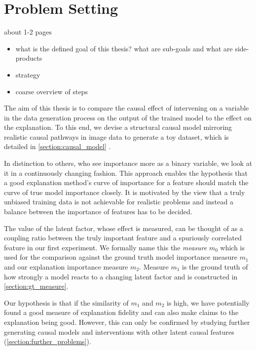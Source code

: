 \chapter{Problem Setting}\label{chapter:problem_setting}
{ \color{red}

    about 1-2 pages

    \begin{itemize}
        \item what is the defined goal of this thesis? what are sub-goals and what are side-products
        \item strategy
        \item coarse overview of steps
    \end{itemize}
}

The aim of this thesis is to compare the causal effect of intervening on a variable in the data generation process on the output of the trained model to the effect on the explanation. To this end, we devise a structural causal model mirroring realistic causal pathways in image data to generate a toy dataset, which is detailed in \autoref{section:causal_model} .


In distinction to others, who see importance more as a binary variable, we look at it in a continuously changing fashion. This approach enables the hypothesis that a good explanation method's curve of importance for a feature should match the curve of true model importance closely. It is motivated by the view that a truly unbiased training data is not achievable for realistic problems and instead a balance between the importance of features has to be decided. 

 
The value of the latent factor, whose effect is measured, can be thought of as a coupling ratio between the truly important feature and a spuriously correlated feature in our first experiment. We formally name this the \textit{measure} $m_0$ which is used for the comparison against the ground truth model importance measure $m_1$ and our explanation importance measure $m_2$. Measure $m_1$ is the ground truth of how strongly a model reacts to a changing latent factor and is constructed in \cref{section:gt_measure}. 


Our hypothesis is that if the similarity of $m_1$ and $m_2$ is high, we have potentially found a good measure of explanation fidelity and can also make claims to the explanation being good. However, this can only be confirmed by studying further generating causal models and interventions with other latent causal features (\cref{section:further_problems}). 


